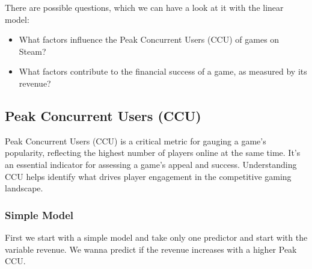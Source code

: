 \documentclass[
]{article}
\newenvironment{Shaded}{\begin{snugshade}}{\end{snugshade}}
\newcommand{\AttributeTok}[1]{\textcolor[rgb]{0.13,0.29,0.53}{#1}}
\newcommand{\CommentTok}[1]{\textcolor[rgb]{0.56,0.35,0.01}{\textit{#1}}}
\newcommand{\DecValTok}[1]{\textcolor[rgb]{0.00,0.00,0.81}{#1}}
\newcommand{\FunctionTok}[1]{\textcolor[rgb]{0.13,0.29,0.53}{\textbf{#1}}}
\newcommand{\NormalTok}[1]{#1}
\newcommand{\OtherTok}[1]{\textcolor[rgb]{0.56,0.35,0.01}{#1}}
\newcommand{\SpecialCharTok}[1]{\textcolor[rgb]{0.81,0.36,0.00}{\textbf{#1}}}
\newcommand{\StringTok}[1]{\textcolor[rgb]{0.31,0.60,0.02}{#1}}
\providecommand{\tightlist}{%
  \setlength{\itemsep}{0pt}\setlength{\parskip}{0pt}}
\begin{document}
There are possible questions, which we can have a look at it with the
linear model:

\begin{itemize}
\tightlist
\item
  What factors influence the Peak Concurrent Users (CCU) of games on
  Steam?
\item
  What factors contribute to the financial success of a game, as
  measured by its revenue?
\end{itemize}

\hypertarget{peak-concurrent-users-ccu}{%
\subsection{Peak Concurrent Users
(CCU)}\label{peak-concurrent-users-ccu}}

Peak Concurrent Users (CCU) is a critical metric for gauging a game's
popularity, reflecting the highest number of players online at the same
time. It's an essential indicator for assessing a game's appeal and
success. Understanding CCU helps identify what drives player engagement
in the competitive gaming landscape.

\hypertarget{simple-model}{%
\subsubsection{Simple Model}\label{simple-model}}

First we start with a simple model and take only one predictor and start
with the variable revenue. We wanna predict if the revenue increases
with a higher Peak CCU.

\begin{Shaded}
\end{Shaded}
\end{document}
